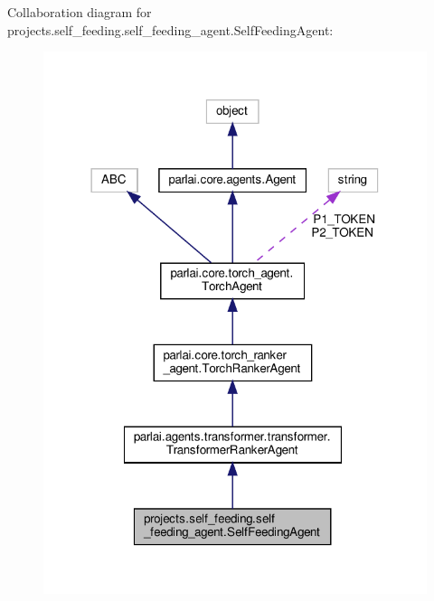 Collaboration diagram for projects.\+self\+\_\+feeding.\+self\+\_\+feeding\+\_\+agent.\+Self\+Feeding\+Agent\+:
\nopagebreak
\begin{figure}[H]
\begin{center}
\leavevmode
\includegraphics[width=318pt]{classprojects_1_1self__feeding_1_1self__feeding__agent_1_1SelfFeedingAgent__coll__graph}
\end{center}
\end{figure}
